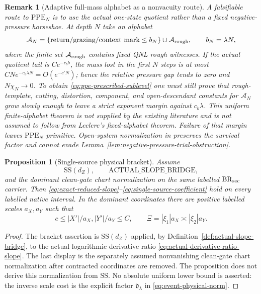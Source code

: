 \documentclass[11pt]{article}
\newtheorem{proposition}[theorem]{Proposition}
\newtheorem{remark}[theorem]{Remark}
\begin{document}
\begin{remark}[Adaptive full-mass alphabet as a nonvacuity route]
\label{rem:high-pressure-clean-route}
A falsifiable route to $\mathrm{PPE}_{N}$ is to use the actual one-state
quotient rather than a fixed negative-pressure horseshoe.  At depth $N$ take
an alphabet
\[
 \mathcal A_N=\{\text{return/grazing/context mark}\le b_N\}
 \cup\mathcal A_{\rm rough},\qquad b_N=\lambda N,
\]
where the finite set $\mathcal A_{\rm rough}$ contains fixed QNL rough
witnesses.  If the actual quotient tail is $Ce^{-c_b b}$, the mass lost in
the first $N$ steps is at most
$CN e^{-c_b\lambda N}=O(e^{-c'N})$; hence the relative pressure gap tends to
zero and $N\chi_N\to0$.  To obtain \eqref{eq:ppe-prescribed-sublevel} one
must still prove that rough-template, cutting, distortion, component, and
open-descendant constants for $\mathcal A_N$ grow slowly enough to leave a
strict exponent margin against $c_b\lambda$.  This uniform finite-alphabet
theorem is not supplied by the existing literature and is not assumed to
follow from Leclerc's fixed-alphabet theorem.  Failure of that margin leaves
$\mathrm{PPE}_{N}$ primitive.  Open-system normalization in
\cite{CanestrariHoles,DLreview} preserves the survival factor and cannot
evade Lemma~\ref{lem:negative-pressure-trial-obstruction}.
\end{remark}

\begin{proposition}[Single-source physical bracket]
\label{prop:exact-reduced-slope}
Assume
\[
 \mathrm{SS}(d_Z),\qquad
 \mathrm{ACTUAL\_SLOPE\_BRIDGE},
\]
and the dominant clean-gate chart normalization on the same labelled
$\mathrm{BR}_{\rm sec}$ carrier.  Then
\eqref{eq:exact-reduced-slope}--\eqref{eq:single-source-coefficient} hold on
every labelled native interval.  In the dominant coordinates there are
positive labelled scales $a_X,a_Y$ such that
\begin{equation}
\label{eq:dominant-coordinate-normalization}
 c\le |X'|/a_X,|Y'|/a_Y\le C,
 \qquad \Xi=|\xi_1|a_X\asymp|\xi_2|a_Y.
\end{equation}
\end{proposition}

\begin{proof}
The bracket assertion is $\mathrm{SS}(d_Z)$ applied, by
Definition~\ref{def:actual-slope-bridge}, to the actual logarithmic
derivative ratio \eqref{eq:actual-derivative-ratio-slope}.  The last display
is the separately assumed nonvanishing clean-gate chart normalization after
contracted coordinates are removed.  The proposition does not derive this
normalization from $\mathrm{SS}$.  No absolute uniform lower bound is
asserted: the inverse scale cost is the explicit factor
$\mathfrak d_\lambda$ in \eqref{eq:event-physical-norm}.
\end{proof}
\end{document}
